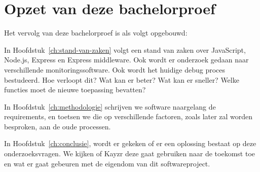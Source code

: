 \section{Opzet van deze bachelorproef}
\label{sec:opzet-bachelorproef}


Het vervolg van deze bachelorproef is als volgt opgebouwd:

In Hoofdstuk~\ref{ch:stand-van-zaken} volgt een stand van zaken over JavaScript, Node.js, Express en Express middleware. Ook wordt er onderzoek gedaan naar verschillende monitoringssoftware. Ook wordt het huidige debug proces bestudeerd. Hoe verloopt dit? Wat kan er beter? Wat kan er sneller? Welke functies moet de nieuwe toepassing bevatten?

In Hoofdstuk~\ref{ch:methodologie} schrijven we software naargelang de requirements, en toetsen we die op verschillende factoren, zoals later zal worden besproken, aan de oude processen.


In Hoofdstuk~\ref{ch:conclusie}, wordt er gekeken of er een oplossing bestaat op deze onderzoeksvragen. We kijken of Kayzr deze gaat gebruiken naar de toekomst toe en wat er gaat gebeuren met de eigendom van dit softwareproject.

